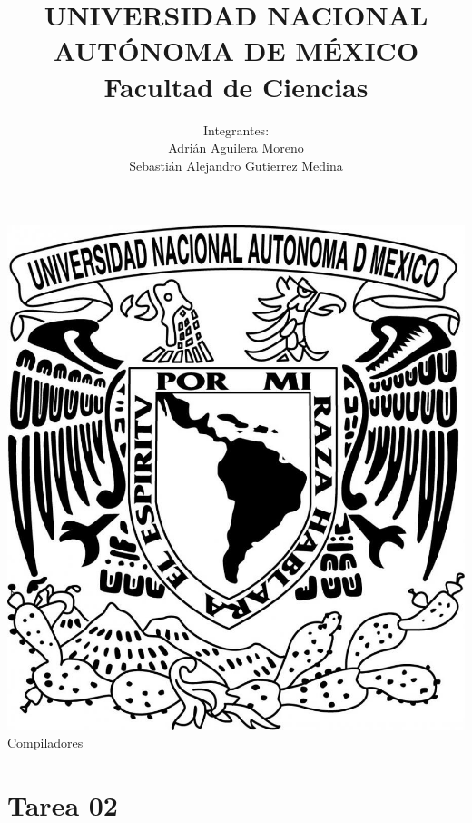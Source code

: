 \documentclass{article}
\begin{document}
\title{UNIVERSIDAD NACIONAL AUT\'ONOMA DE M\'EXICO\\ Facultad de Ciencias}
\author{Integrantes: \\
  Adri\'an Aguilera Moreno\\
  Sebastián Alejandro Gutierrez Medina}
\date{}
\maketitle
\begin{center}
  \includegraphics[scale=0.20]{../Imagen/Portada}\\[0.4cm]
  \Large
  \textbf{\normalsize}{Compiladores}

\end{center}
\newpage
{}
\section*{\LARGE{Tarea 02}}

\newline


\newpage

\newpage

\newpage

\end{document}
